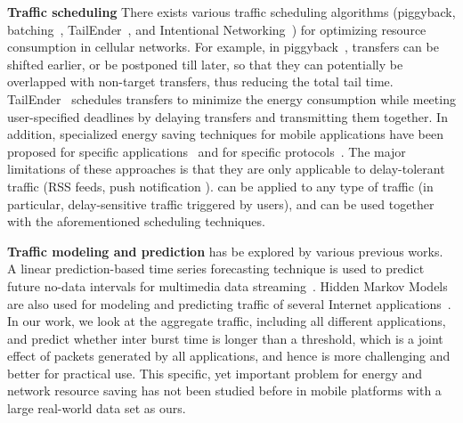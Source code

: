 \textbf{Traffic scheduling} There exists various traffic scheduling algorithms (\eg piggyback, batching~\cite{qian12_www, mobisys10_ra}, TailEnder~\cite{imc.tailender}, and Intentional Networking~\cite{higgins10}) for optimizing resource consumption in cellular networks. For example, in piggyback~\cite{qian12_www}, transfers can be shifted earlier, or be postponed till later, so that they can potentially be overlapped with non-target transfers, thus reducing the total tail time. TailEnder~\cite{imc.tailender} schedules transfers to minimize the energy consumption while meeting user-specified deadlines by delaying transfers and transmitting them together. In addition, specialized energy saving techniques for mobile applications have been proposed for specific applications~\cite{mobisys09_wang, mobisys08_kang} and for specific protocols~\cite{mobisys07_agarwal}. The major limitations of these approaches is that they are only applicable to delay-tolerant traffic (RSS feeds, push notification \etc). \NAME can be applied to any type of traffic (in particular, delay-sensitive traffic triggered by users), and can be used together with the aforementioned scheduling techniques.

\textbf{Traffic modeling and prediction} has be explored by various previous works. A linear prediction-based time series forecasting technique is used to predict future no-data intervals for multimedia data streaming~\cite{wcnc04}. Hidden Markov Models are also used for modeling and predicting traffic of several Internet applications~\cite{Dainotti20082645}. In our work, we look at the aggregate traffic, including all different applications, and predict whether inter burst time is longer than a threshold, which is a joint effect of packets generated by all applications, and hence is more challenging and better for practical use. This specific, yet important problem for energy and network resource saving has not been studied before in mobile platforms with a large real-world data set as ours.

